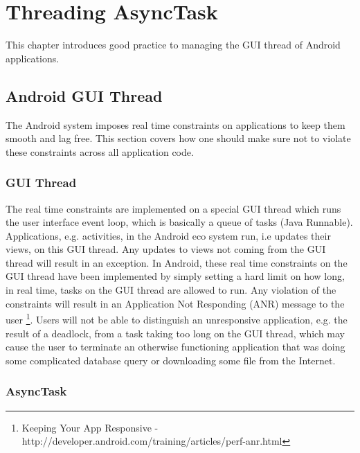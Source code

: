 \chapter{Threading AsyncTask}\label{app:threading_asynctask}

This chapter introduces good practice to managing the GUI thread of Android applications.  

\section{Android GUI Thread}
\label{sec:gui_thread_async_task}

The Android system imposes real time constraints on applications to keep them smooth and lag free. This section covers how one should make sure not to violate these constraints across all application code.

\subsection{GUI Thread}
The real time constraints are implemented on a special GUI thread which runs the user interface event loop, which is basically a queue of tasks (Java Runnable). Applications, e.g. activities, in the Android eco system run, i.e updates their views, on this GUI thread. Any updates to views not coming from the GUI thread will result in an exception. In Android, these real time constraints on the GUI thread have been implemented by simply setting a hard limit on how long, in real time, tasks on the GUI thread are allowed to run. Any violation of the constraints will result in an Application Not Responding (ANR) message to the user \footnote{Keeping Your App Responsive - http://developer.android.com/training/articles/perf-anr.html}. Users will not be able to distinguish an unresponsive application, e.g. the result of a deadlock, from a task taking too long on the GUI thread, which may cause the user to terminate an otherwise functioning application that was doing some complicated database query or downloading some file from the Internet. 

\subsection{AsyncTask}

